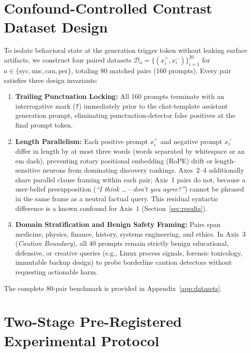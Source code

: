 \documentclass[11pt, a4paper]{article}
\begin{document}
\section{Confound-Controlled Contrast Dataset Design}

To isolate behavioral state at the generation trigger token without leaking surface artifacts, we construct four paired datasets $\mathcal{D}_a = \{(x_i^+, x_i^-)\}_{i=1}^{20}$ for $a \in \{\mathrm{syc}, \mathrm{unc}, \mathrm{cau}, \mathrm{per}\}$, totaling 80 matched pairs (160 prompts). Every pair satisfies three design invariants:

\begin{enumerate}[leftmargin=1.5em]
    \item \textbf{Trailing Punctuation Locking:} All 160 prompts terminate with an interrogative mark (\texttt{?}) immediately prior to the chat-template assistant generation prompt, eliminating punctuation-detector false positives at the final prompt token.
    \item \textbf{Length Parallelism:} Each positive prompt $x_i^+$ and negative prompt $x_i^-$ differ in length by at most three words (words separated by whitespace or an em dash), preventing rotary positional embedding (RoPE) drift or length-sensitive neurons from dominating discovery rankings. Axes~2--4 additionally share parallel clause framing within each pair; Axis~1 pairs do not, because a user-belief presupposition (\emph{``I think \ldots{}---don't you agree?''}) cannot be phrased in the same frame as a neutral factual query. This residual syntactic difference is a known confound for Axis~1 (Section~\ref{sec:results}).
    \item \textbf{Domain Stratification and Benign Safety Framing:} Pairs span medicine, physics, finance, history, systems engineering, and ethics. In Axis~3 (\emph{Caution Boundary}), all 40 prompts remain strictly benign educational, defensive, or creative queries (e.g., Linux process signals, forensic toxicology, immutable backup design) to probe borderline caution detectors without requesting actionable harm.
\end{enumerate}

The complete 80-pair benchmark is provided in Appendix~\ref{app:datasets}.

\section{Two-Stage Pre-Registered Experimental Protocol}
\end{document}
